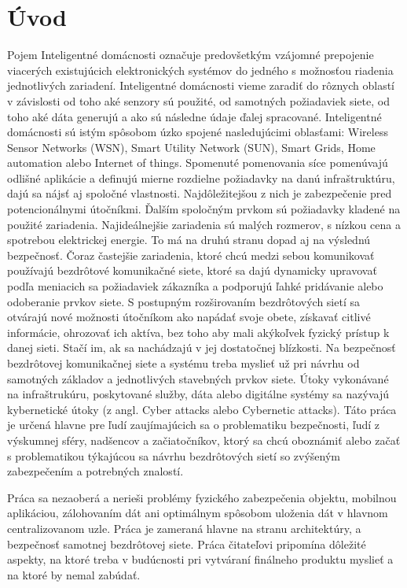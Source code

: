 \documentclass[12pt,a4wide,oneside,openright]{report}
\begin{document}

\newpage 
{}
\setcounter{page}{1}


\chapter{Úvod}
Pojem Inteligentné domácnosti označuje predovšetkým vzájomné prepojenie viacerých existujúcich elektronických systémov do jedného s možnosťou riadenia jednotlivých zariadení.
Inteligentné domácnosti vieme zaradiť do rôznych oblastí v závislosti od toho aké senzory sú použité, od samotných požiadaviek siete, od toho aké dáta generujú a ako sú následne údaje ďalej spracované. Inteligentné domácnosti sú istým spôsobom úzko spojené nasledujúcimi oblasťami: Wireless Sensor Networks (WSN), Smart Utility Network (SUN), Smart Grids, Home automation alebo Internet of things. Spomenuté pomenovania síce pomenúvajú odlišné aplikácie a definujú mierne rozdielne požiadavky na danú infraštruktúru, dajú sa nájsť aj spoločné vlastnosti. Najdôležitejšou z nich je zabezpečenie pred potencionálnymi útočníkmi.
Ďalším spoločným prvkom sú požiadavky kladené na použité zariadenia. Najideálnejšie zariadenia sú malých rozmerov, s nízkou cena a spotrebou elektrickej energie. To má na druhú stranu dopad aj na výslednú bezpečnosť.
Čoraz častejšie zariadenia, ktoré chcú medzi sebou komunikovať používajú bezdrôtové komunikačné siete, ktoré sa dajú dynamicky upravovať podľa meniacich sa požiadaviek zákazníka a podporujú ľahké pridávanie alebo odoberanie prvkov siete.
S postupným rozširovaním bezdrôtových sietí sa otvárajú nové možnosti útočníkom ako napádať svoje obete, získavať citlivé informácie, ohrozovať ich aktíva, bez toho aby mali akýkoľvek fyzický prístup k danej sieti. Stačí im, ak sa nachádzajú v jej dostatočnej blízkosti.
Na bezpečnosť bezdrôtovej komunikačnej siete a systému treba myslieť už pri návrhu od samotných základov a jednotlivých stavebných prvkov siete.
Útoky vykonávané na infraštrukúru, poskytované služby, dáta alebo digitálne systémy sa nazývajú kybernetické útoky (z angl. Cyber attacks alebo Cybernetic attacks).
Táto práca je určená hlavne pre ľudí zaujímajúcich sa o problematiku bezpečnosti, ľudí z výskumnej sféry, nadšencov a začiatočníkov, ktorý sa chcú oboznámiť alebo začať s problematikou týkajúcou sa návrhu bezdrôtových sietí so zvýšeným zabezpečením a potrebných znalostí.

Práca sa nezaoberá a nerieši problémy fyzického zabezpečenia objektu, mobilnou aplikáciou, zálohovaním dát ani optimálnym spôsobom uloženia dát v hlavnom centralizovanom uzle. Práca je zameraná hlavne na stranu architektúry, a bezpečnosť samotnej bezdrôtovej siete. Práca čitateľovi pripomína dôležité aspekty, na ktoré treba v budúcnosti pri vytváraní finálneho produktu myslieť a na ktoré by nemal zabúdať.
\end{document}

